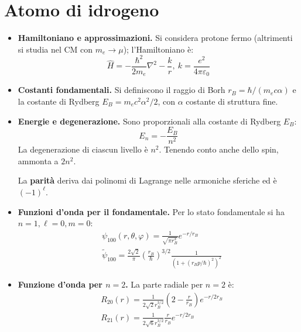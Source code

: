 \documentclass[11pt, a4paper]{scrartcl} %
\numberwithin{equation}{section}
\theoremstyle{style2}
\theoremstyle{style1}
\begin{document}
\section{Atomo di idrogeno}
\begin{multicols}{2}	
	\begin{itemize}
		\item {\sffamily \bfseries Hamiltoniano e approssimazioni.} 
			Si considera protone fermo (altrimenti si studia nel CM con $m_e\to \mu $); l'Hamiltoniano \`e:
			\begin{equation}
				\hat{H} = - \frac{\hbar ^2}{2m_e}\nabla ^2 - \frac{k}{r}, \ k = \frac{e^2}{4\pi \varepsilon _0}
			\end{equation}
		\item {\sffamily \bfseries Costanti fondamentali.} Si definiscono il raggio di Borh $r_B = \hbar / (m_e c \alpha )$ e la costante di Rydberg $E_B = m_e c^2 \alpha  ^2 / 2$, con $\alpha $ costante di struttura fine.
			\item {\sffamily \bfseries Energie e degenerazione.} Sono proporzionali alla costante di Rydberg $E_B$:
				\begin{equation}
					E_n =- \frac{E_B}{n^2}
				\end{equation}
				La degenerazione di ciascun livello \`e $n^2$. 
				Tenendo conto anche dello spin, ammonta a $2n^2$.

				La \textbf{parit\`a} deriva dai polinomi di Lagrange nelle armoniche sferiche ed \`e $(-1)^\ell $.
			\item {\sffamily \bfseries Funzioni d'onda per il fondamentale.} Per lo stato fondamentale si ha $n=1, \ell =0, m =0$:
				\begin{equation}
					\begin{split}
						&\psi _{100} (r,\theta ,\varphi ) = \frac{1}{\sqrt{\pi r_B^3 } } e^{-r / r_B} \\
						&\widetilde{\psi }_{100} =\frac{2 \sqrt{2} }{\pi} \left(\frac{r_B}{\hbar }\right) ^{3/2} \frac{1}{(1+(r_B p / \hbar )^2)^2}
					\end{split}
				\end{equation}
				\item {\sffamily \bfseries Funzione d'onda per $n=2$.} 
					La parte radiale per $n=2$ \`e:
					\begin{equation}
						\begin{split}
							&R_{20} (r) = \frac{1}{2\sqrt{2} r_B^{3 / 2} } \left(2 - \frac{r}{r_B}\right) e^{-r / 2r_B} \\
							&R_{21} (r) = \frac{1}{2\sqrt{6} r_B^{3 / 2} } \frac{r}{r_B} e^{-r / 2r_B} 
						\end{split}
					\end{equation}
	\end{itemize}
\end{multicols}
\end{document}
